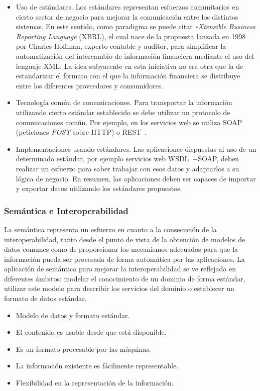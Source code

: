 \begin{itemize}
\item Uso de estándares. Los estándares representan esfuerzos comunitarios en
cierto sector de negocio para mejorar la comunicación entre los distintos
sistemas. En este sentido, como paradigma se puede citar \textit{eXtensible Business
Reporting Language}  (\gls{XBRL}), el cual nace de la
propuesta lanzada en 1998 por Charles Hoffman, experto contable y auditor, para
simplificar la automatización del intercambio de información financiera mediante
el uso del lenguaje \gls{XML}. La idea subyacente en esta iniciativa no era otra que la
de estandarizar el formato con el que la información financiera se distribuye
entre los diferentes proveedores y consumidores.

\item Tecnología común de comunicaciones. Para transportar la información
utilizando cierto estándar establecido se debe utilizar un protocolo de
comunicaciones común. Por ejemplo, en los servicios web se utiliza
\gls{SOAP}~\cite{SOAP11} (peticiones \textit{\gls{POST}} sobre \gls{HTTP}) o \gls{REST}~\cite{Fielding2000}.

\item Implementaciones usando estándares. Las aplicaciones dispuestas al uso de
un determinado estándar, por ejemplo servicios web \gls{WSDL}~\cite{WSDL}+SOAP, deben realizar un
esfuerzo para saber trabajar con esos datos y adaptarlos a su lógica de negocio.
En resumen, las aplicaciones deben ser capaces de importar y exportar datos
utilizando los estándares propuestos.
\end{itemize}

\subsubsection{Semántica e Interoperabilidad}
La semántica representa un esfuerzo en cuanto a la consecución de la
interoperabilidad, tanto desde el punto de vista de la obtención de modelos de datos
comunes como de proporcionar los mecanismos adecuados para que la información
pueda ser procesada de forma automática por las aplicaciones. La aplicación de
semántica para mejorar la interoperabilidad se ve reflejada en diferentes
ámbitos: modelar el conocimiento de un dominio de forma estándar, utilizar este
modelo para describir los servicios del dominio o establecer un formato de
datos estándar. 

\begin{itemize}
\item Modelo de datos y formato estándar.
\item  El contenido es usable desde que está disponible.
\item  Es un formato procesable por las máquinas.
\item La información existente es fácilmente representable.
\item Flexibilidad en la representación de la información.
\end{itemize}

